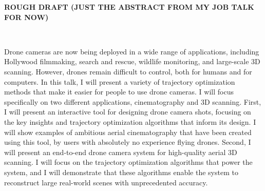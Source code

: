 
\textbf{ROUGH DRAFT (JUST THE ABSTRACT FROM MY JOB TALK FOR NOW)}

~

\hspace{-15pt}Drone cameras are now being deployed in a wide range of applications, including Hollywood filmmaking, search and rescue, wildlife monitoring, and large-scale 3D scanning.
However, drones remain difficult to control, both for humans and for computers.
In this talk, I will present a variety of trajectory optimization methods that make it easier for people to use drone cameras.
I will focus specifically on two different applications, cinematography and 3D scanning.
First, I will present an interactive tool for designing drone camera shots, focusing on the key insights and trajectory optimization algorithms that inform its design.
I will show examples of ambitious aerial cinematography that have been created using this tool, by users with absolutely no experience flying drones.
Second, I will present an end-to-end drone camera system for high-quality aerial 3D scanning.
I will focus on the trajectory optimization algorithms that power the system, and I will demonstrate that these algorithms enable the system to reconstruct large real-world scenes with unprecedented accuracy.
